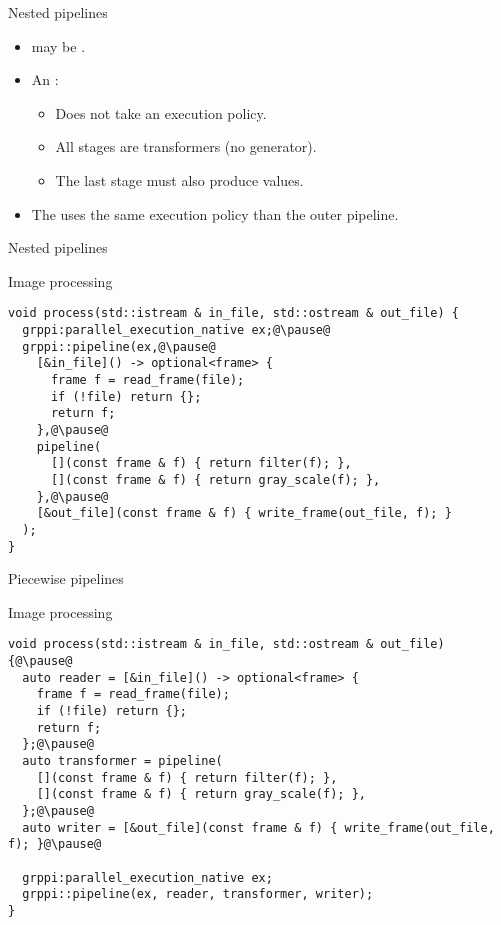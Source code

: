 \begin{frame}[t,fragile]{Nested pipelines}
\begin{itemize}
  \item {} may be .
  \vfill
  \item An :
    \begin{itemize}
      \item Does not take an execution policy.
      \item All stages are transformers (no generator).
      \item The last stage must also produce values.
    \end{itemize}
  \vfill
  \item The  uses the same execution policy than the outer
        pipeline.
\end{itemize}
\end{frame}

\begin{frame}[t,fragile]{Nested pipelines}
\begin{block}{Image processing}
\begin{lstlisting}[escapechar=@]
void process(std::istream & in_file, std::ostream & out_file) {
  grppi:parallel_execution_native ex;@\pause@
  grppi::pipeline(ex,@\pause@
    [&in_file]() -> optional<frame> {
      frame f = read_frame(file);
      if (!file) return {};
      return f;
    },@\pause@
    pipeline(
      [](const frame & f) { return filter(f); },
      [](const frame & f) { return gray_scale(f); },
    },@\pause@
    [&out_file](const frame & f) { write_frame(out_file, f); }
  );
}
\end{lstlisting}
\end{block}
\end{frame}

\begin{frame}[t,fragile]{Piecewise pipelines}
\begin{block}{Image processing}
\begin{lstlisting}[escapechar=@]
void process(std::istream & in_file, std::ostream & out_file) {@\pause@
  auto reader = [&in_file]() -> optional<frame> {
    frame f = read_frame(file);
    if (!file) return {};
    return f;
  };@\pause@
  auto transformer = pipeline(
    [](const frame & f) { return filter(f); },
    [](const frame & f) { return gray_scale(f); },
  };@\pause@
  auto writer = [&out_file](const frame & f) { write_frame(out_file, f); }@\pause@

  grppi:parallel_execution_native ex;
  grppi::pipeline(ex, reader, transformer, writer);
}
\end{lstlisting}
\end{block}
\end{frame}
